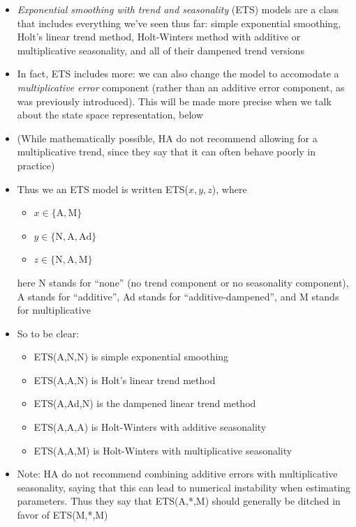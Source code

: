 \documentclass{article}
\begin{document}
\begin{itemize}
\item \emph{Exponential smoothing with trend and seasonality} (ETS) models are a
  class that includes everything we've seen thus far: simple exponential
  smoothing, Holt's linear trend method, Holt-Winters method with additive or
  multiplicative seasonality, and all of their dampened trend versions  

\item In fact, ETS includes more: we can also change the model to accomodate a  
  \emph{multiplicative error} component (rather than an additive error
  component, as was previously introduced). This will be made more precise when
  we talk about the state space representation, below 

\item (While mathematically possible, HA do not recommend allowing for a
  multiplicative trend, since they say that it can often behave poorly in
  practice) 

\item Thus we an ETS model is written ETS($x,y,z$), where 
  \begin{itemize}
  \item $x \in \{ \text{A}, \text{M} \}$
  \item $y \in \{ \text{N}, \text{A}, \text{Ad} \}$
  \item $z \in \{ \text{N}, \text{A}, \text{M} \}$
  \end{itemize}
  here N stands for ``none'' (no trend component or no seasonality component), A
  stands for ``additive'', Ad stands for ``additive-dampened'', and M stands for
  multiplicative

\item So to be clear:
  \begin{itemize}
  \item ETS(A,N,N) is simple exponential smoothing
  \item ETS(A,A,N) is Holt's linear trend method
  \item ETS(A,Ad,N) is the dampened linear trend method
  \item ETS(A,A,A) is Holt-Winters with additive seasonality
  \item ETS(A,A,M) is Holt-Winters with multiplicative seasonality
  \end{itemize}

\item Note: HA do not recommend combining additive errors with multiplicative
  seasonality, saying that this can lead to numerical instability when
  estimating parameters. Thus they say that ETS(A,*,M) should generally be
  ditched in favor of ETS(M,*,M)   
\end{itemize}
\end{document}
